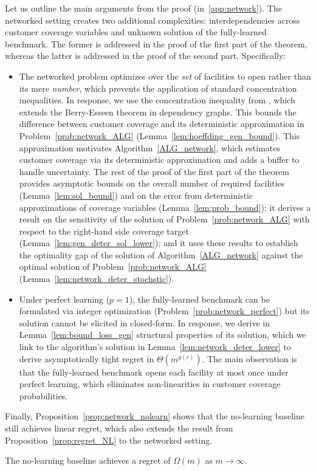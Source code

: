 \documentclass[blindrev]{informs3noheader}
\begin{document}
Let us outline the main arguments from the proof (in~\ref{app:network}). The networked setting creates two additional complexities: interdependencies across customer coverage variables and unknown solution of the fully-learned benchmark. The former is addressed in the proof of the first part of the theorem, whereas the latter is addressed in the proof of the second part. Specifically:
\begin{itemize}
\item[--] The networked problem optimizes over the \textit{set} of facilities to open rather than its mere \textit{number}, which prevents the application of standard concentration inequalities. In response, we use the concentration inequality from \cite{janisch2024berry}, which extends the Berry-Esseen theorem in dependency graphs. This bounds the difference between customer coverage and its deterministic approximation in Problem~\eqref{prob:network_ALG} (Lemma~\ref{lem:hoeffding_gen_bound}). This approximation motivates Algorithm~\ref{ALG_network}, which estimates customer coverage via its deterministic approximation and adds a buffer to handle uncertainty. The rest of the proof of the first part of the theorem provides asymptotic bounds on the overall number of required facilities (Lemma~\ref{lem:sol_bound}) and on the error from deterministic approximations of coverage variables (Lemma~\ref{lem:prob_bound}); it derives a result on the sensitivity of the solution of Problem~\eqref{prob:network_ALG} with respect to the right-hand side coverage target (Lemma~\ref{lem:gen_deter_sol_lower}); and it uses these results to establish the optimality gap of the solution of Algorithm~\ref{ALG_network} against the optimal solution of Problem~\eqref{prob:network_ALG} (Lemma~\ref{lem:network_deter_stochstic}).
\item[--] Under perfect learning ($p=1$), the fully-learned benchmark can be formulated via integer optimization (Problem~\eqref{prob:network_perfect}) but its solution cannot be elicited in closed-form. In response, we derive in Lemma~\ref{lem:bound_loss_gen} structural properties of its solution, which we link to the algorithm's solution in Lemma~\ref{lem:network_deter_lower} to derive asymptotically tight regret in $\Theta(m^{g(r)})$. The main observation is that the fully-learned benchmark opens each facility at most once under perfect learning, which eliminates non-linearities in customer coverage probabilities.
\end{itemize}

Finally, Proposition~\ref{prop:network_nolearn} shows that the no-learning baseline still achieves linear regret, which also extends the result from Proposition~\ref{prop:regret_NL} to the networked setting.
\begin{proposition}\label{prop:network_nolearn}
The no-learning baseline achieves a regret of $\Omega\left(m\right)$ as $m \to \infty$.
\end{proposition}
\end{document}
